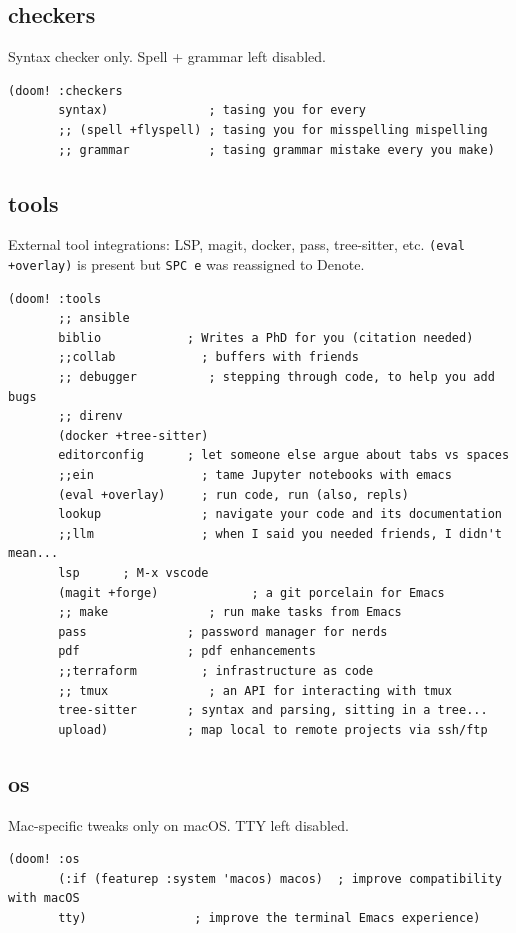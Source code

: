 \documentclass[11pt]{article}
\begin{document}
\subsection{checkers}
\label{sec:org5d13642}
Syntax checker only. Spell + grammar left disabled.

\begin{verbatim}
(doom! :checkers
       syntax)              ; tasing you for every
       ;; (spell +flyspell) ; tasing you for misspelling mispelling
       ;; grammar           ; tasing grammar mistake every you make)
\end{verbatim}
\subsection{tools}
\label{sec:org236d880}
External tool integrations: LSP, magit, docker, pass, tree-sitter, etc.
\texttt{(eval +overlay)} is present but \texttt{SPC e} was reassigned to Denote.

\begin{verbatim}
(doom! :tools
       ;; ansible
       biblio            ; Writes a PhD for you (citation needed)
       ;;collab            ; buffers with friends
       ;; debugger          ; stepping through code, to help you add bugs
       ;; direnv
       (docker +tree-sitter)
       editorconfig      ; let someone else argue about tabs vs spaces
       ;;ein               ; tame Jupyter notebooks with emacs
       (eval +overlay)     ; run code, run (also, repls)
       lookup              ; navigate your code and its documentation
       ;;llm               ; when I said you needed friends, I didn't mean...
       lsp      ; M-x vscode
       (magit +forge)             ; a git porcelain for Emacs
       ;; make              ; run make tasks from Emacs
       pass              ; password manager for nerds
       pdf               ; pdf enhancements
       ;;terraform         ; infrastructure as code
       ;; tmux              ; an API for interacting with tmux
       tree-sitter       ; syntax and parsing, sitting in a tree...
       upload)           ; map local to remote projects via ssh/ftp
\end{verbatim}
\subsection{os}
\label{sec:orgc680619}
Mac-specific tweaks only on macOS. TTY left disabled.

\begin{verbatim}
(doom! :os
       (:if (featurep :system 'macos) macos)  ; improve compatibility with macOS
       tty)               ; improve the terminal Emacs experience)
\end{verbatim}
\end{document}
